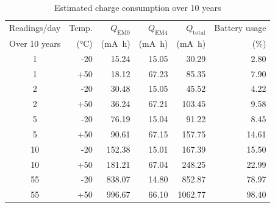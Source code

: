 \begin{table}[!b]
\centering
\caption{Estimated charge consumption over 10 years}
\label{tab:charge_10y}
\begin{tabular}{@{}crrrrr@{}}
\toprule
Readings/day &
Temp. &
$Q_{\mathrm{EM0}}$ &
$Q_{\mathrm{EM4}}$ &
$Q_{\mathrm{total}}$ &
Battery usage \\
Over 10 years  &
(\si{\celsius}) &
(\si{\milli\ampere\hour}) &
(\si{\milli\ampere\hour}) &
(\si{\milli\ampere\hour}) &
(\%) \\
\midrule
1  & -20 & 15.24  & 15.05 & 30.29   & 2.80 \\
1  & +50 & 18.12  & 67.23 & 85.35   & 7.90 \\
\hline
2  & -20 & 30.48  & 15.05 & 45.52   & 4.22 \\
2  & +50 & 36.24  & 67.21 & 103.45  & 9.58 \\
\hline
5  & -20 & 76.19  & 15.04 & 91.22   & 8.45 \\
5  & +50 & 90.61  & 67.15 & 157.75  & 14.61 \\
\hline
10 & -20 & 152.38 & 15.01 & 167.39  & 15.50 \\
10 & +50 & 181.21 & 67.04 & 248.25  & 22.99 \\
\hline
55 & -20 & 838.07 & 14.80 & 852.87  & 78.97 \\
55 & +50 & 996.67 & 66.10 & 1062.77 & 98.40 \\
\bottomrule
\end{tabular}
\end{table}

